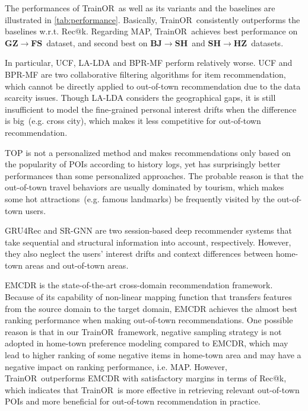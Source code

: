 \documentclass[letterpaper]{article} %
\newcommand{\ourmodel}{{\sc TrainOR}}
\newcommand{\bjsh}{{\bf BJ\ensuremath{\rightarrow}SH}}
\newcommand{\shhz}{{\bf SH\ensuremath{\rightarrow}HZ}}
\newcommand{\gzfs}{{\bf GZ\ensuremath{\rightarrow}FS}}
\begin{document}
The performances of \ourmodel ~as well as its variants and the baselines are illustrated in \cref{tab:performance}. 
Basically, \ourmodel~consistently outperforms the baselines w.r.t. Rec@k.
Regarding MAP, \ourmodel~achieves best performance on \gzfs ~dataset, and second best on \bjsh ~and \shhz ~datasets.

In particular, UCF, LA-LDA and BPR-MF perform relatively worse. 
UCF and BPR-MF are two collaborative filtering algorithms for item recommendation, 
which cannot be directly applied to out-of-town recommendation due to the data scarcity issues. 
Though LA-LDA considers the geographical gaps, it is still insufficient to model the fine-grained personal interest drifts when the difference is big~(e.g. cross city), which makes it less competitive for out-of-town recommendation. %

TOP is not a personalized method and makes recommendations only based on the popularity of POIs according to history logs, 
yet has surprisingly better performances than some personalized approaches. 
The probable reason is that the out-of-town travel behaviors are usually dominated by tourism, which makes some hot attractions~(e.g. famous landmarks) be frequently visited by the out-of-town users.

GRU4Rec and SR-GNN are two session-based deep recommender systems that take sequential and structural information into account, respectively. 
However, they also neglect the users' interest drifts and context differences between home-town areas and out-of-town areas.

EMCDR is the state-of-the-art cross-domain recommendation framework. 
Because of its capability of non-linear mapping function that transfers features from the source domain to the target domain, EMCDR achieves the almost best ranking performance when making out-of-town recommendations.
%
One possible reason is that in our \ourmodel~framework, negative sampling strategy is not adopted in home-town preference modeling compared to EMCDR, 
which may lead to higher ranking of some negative items in home-town area and may have a negative impact on ranking performance, i.e. MAP. 
%
However, \ourmodel~outperforms EMCDR with satisfactory margins in terms of Rec@k, which indicates that \ourmodel~is more effective in retrieving relevant out-of-town POIs and more beneficial for out-of-town recommendation in practice.
\end{document}
